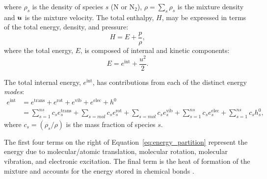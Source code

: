 \documentclass[10pt]{article}
\newcommand{\bv}[1]{\ensuremath{\mbox{\boldmath$ #1 $}}}
\begin{document}
%
where $\rho_s$ is the density of species $s$ (N or N$_2$), $\rho=\sum_s \rho_s$ is the mixture density and  $ \bv{u} $ is the mixture velocity. %
%
The total enthalpy, $H$, may be expressed in terms of the total energy, density, and pressure:
$$H = E + \dfrac{p}{\rho},$$
where the total energy, $E$, is composed of internal and kinetic components: $$E = e^{\text{int}} + \dfrac{ u^2 }{2}.$$

The total internal energy, $e^{\text{int}}$, has contributions from each of the distinct energy \emph{modes}:%
\begin{equation}
 \begin{split}
e^{\text{int}} &= e^{\text{trans}} + e^{\text{rot}} + e^{\text{vib}} + e^{\text{elec}} + h^0 \\
 &= \sum_{s=1}^{ns} c_s e^{\text{trans}}_s + \sum_{s=mol} c_s e^{\text{rot}}_s + \sum_{s=mol} c_s e^{\text{vib}}_s + \sum_{s=1}^{ns} c_s e^{\text{elec}}_s + \sum_{s=1}^{ns} c_s h^0_s ,
\label{eq:energy_partition}  
 \end{split}
\end{equation}
where $c_s=\left(\rho_s/\rho\right)$ is the mass fraction of species $s$.

The first four terms on the right of Equation~\eqref{eq:energy_partition} represent the energy due to molecular/atomic translation, molecular rotation, molecular vibration, and electronic excitation. The final term is the heat of formation of the mixture and accounts for the energy stored in chemical bonds \citep{Ait1996,Kirk2009}.
\end{document}

